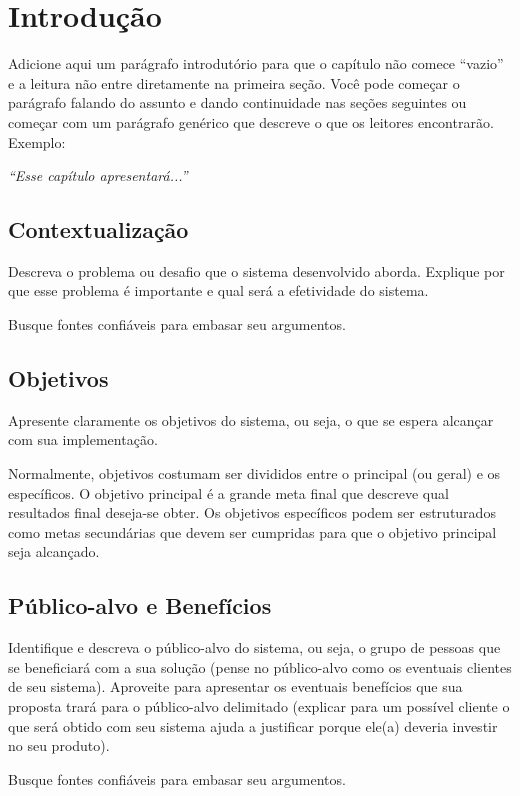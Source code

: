 \chapter{Introdução}

Adicione aqui um parágrafo introdutório para que o capítulo não comece ``vazio'' e a leitura não entre diretamente na primeira seção. Você pode começar o parágrafo falando do assunto e dando continuidade nas seções seguintes ou começar com um parágrafo genérico que descreve o que os leitores encontrarão. Exemplo:

\textit{``Esse capítulo apresentará...''}

\section{Contextualização}

Descreva o problema ou desafio que o sistema desenvolvido aborda. Explique por que esse problema é importante e qual será a efetividade do sistema. 

Busque fontes confiáveis para embasar seu argumentos.

\section{Objetivos}
Apresente claramente os objetivos do sistema, ou seja, o que se espera alcançar com sua implementação. 

Normalmente, objetivos costumam ser divididos entre o principal (ou geral) e os específicos. O objetivo principal é a grande meta final que descreve qual resultados final deseja-se obter. Os objetivos específicos podem ser estruturados como metas secundárias que devem ser cumpridas para que o objetivo principal seja alcançado.

\section{Público-alvo e Benefícios}
Identifique e descreva o público-alvo do sistema, ou seja, o grupo de pessoas que se beneficiará com a sua solução (pense no público-alvo como os eventuais clientes de seu sistema). Aproveite para apresentar os eventuais benefícios que sua proposta trará para o público-alvo delimitado (explicar para um possível cliente o que será obtido com seu sistema ajuda a justificar porque ele(a) deveria investir no seu produto).



Busque fontes confiáveis para embasar seu argumentos.